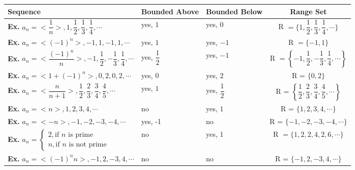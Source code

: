 \documentclass[a4paper]{article}
\newcounter{examplecounter}
\newcommand\examplenumber{\stepcounter{examplecounter}\textbf{Ex.\arabic{examplecounter}} }
\begin{document}
\begin{center}
    \bgroup
    \def\arraystretch{2.5}
        \begin{tabularx}{\linewidth}{|l|X|X|c|}
            \hline
            \textbf{Sequence} & \textbf{Bounded Above} & \textbf{Bounded Below} & \textbf{Range Set} \\
            \hline
            \examplenumber $ a_n = <\dfrac{1}{n}>, 1, \dfrac{1}{2}, \dfrac{1}{3}, \dfrac{1}{4}, \cdots $ & yes, $1$ & yes, $0$ & R $= \{1, \dfrac{1}{2}, \dfrac{1}{3}, \dfrac{1}{4}, \cdots\}$ \\
            \hline
            \examplenumber $ a_n = <(-1)^n>, -1, 1, -1, 1, \cdots $ & yes, $1$ & yes, $-1$ & R $= \{-1, 1\} $ \\
            \hline
            \examplenumber $ a_n = <\dfrac{(-1)^n}{n}>, -1, \dfrac{1}{2}, -\dfrac{1}{3}, \dfrac{1}{4}, \cdots $ & yes, $\dfrac{1}{2}$ & yes, $-1$ & R $= \left\{ -1, \dfrac{1}{2}, -\dfrac{1}{3}, \dfrac{1}{4}, \cdots \right\} $ \\
            \hline
            \examplenumber $ a_n = <1+(-1)^n>, 0, 2, 0, 2, \cdots $ & yes, $0$ & yes, $2$ & R = $\{0, 2\}$\\
            \hline
            \examplenumber $ a_n = <\dfrac{n}{n+1}>, \dfrac{1}{2}, \dfrac{2}{3}, \dfrac{3}{4}, \dfrac{4}{5}, \cdots $ & yes, $1$ & yes, $\dfrac{1}{2}$ & R = $\left\{\dfrac{1}{2}, \dfrac{2}{3}, \dfrac{3}{4}, \dfrac{4}{5}, \cdots\right\}$\\
            \hline
            \examplenumber $ a_n = <n>, 1, 2, 3, 4, \cdots $ & no & yes, $1$ & R = $\{1, 2, 3, 4, \cdots\}$\\
            \hline
            \examplenumber $ a_n = <-n>, -1, -2, -3, -4, \cdots $ & yes, -1 & no & R = $\{-1, -2, -3, -4, \cdots\}$\\
            \hline
            \examplenumber $a_n = 
            \begin{cases*}
                2, \text{if } n \text{ is prime} \\
                n, \text{if } n \text{ is not prime} 
            \end{cases*}
            $ & no & yes, 1 & R $=\{1, 2, 2, 4, 2, 6, \cdots\} $\\
            \hline
            \examplenumber $ a_n = <(-1)^nn>, -1, 2, -3, 4, \cdots $ & no & no & R = $\{-1, 2, -3, 4, \cdots\}$\\
            \hline    
        \end{tabularx}
    \egroup
\end{center}
\end{document}
